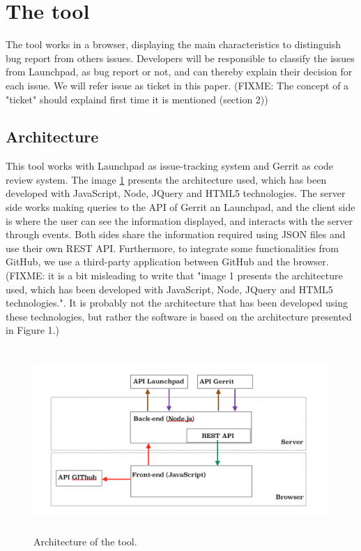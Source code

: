 \documentclass[ifip]{svmult}
\begin{document}
\section{The tool}
\label{sec:2}

The tool works in a browser, displaying the main characteristics to distinguish bug report from others issues. Developers will be responsible to classify the issues from Launchpad, as bug report or not, and can thereby explain their decision for each issue. We will refer issue as ticket in this paper.
(FIXME: The concept of a "ticket" should explaind first time it is mentioned (section 2))


\subsection{Architecture}

This tool works with Launchpad as issue-tracking system and Gerrit as code review system. The image \ref{fig:1} presents the architecture used, which has been developed with JavaScript, Node, JQuery and HTML5 technologies. The server side works making queries to the API of Gerrit an Launchpad, and the client side is where the user can see the information displayed, and interacts with the server through events. Both sides share the information required using JSON files and use their own REST API. Furthermore, to integrate some functionalities from GitHub, we use a third-party application between GitHub and the browser. (FIXME: it is a bit misleading to write that "image 1 presents the architecture used, which has been developed with JavaScript, Node, JQuery and HTML5 technologies.". It is probably not the architecture that has been developed using these technologies, but rather the software is based on the architecture presented in Figure 1.)

\label{sec:2.1}
\begin{figure}
\centering
\includegraphics[height=7cm]{Arquitectura.png}
\caption{Architecture of the tool.}
\label{fig:1}       %
\end{figure}
\end{document}
